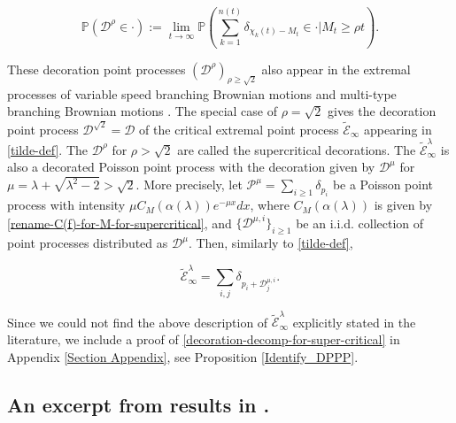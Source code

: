 \documentclass[a4paper,reqno]{amsart}%
\newcommand{\1}{\mathbf 1}
\theoremstyle{mine}
\numberwithin{theorem}{section}
\numberwithin{equation}{section}
\theoremstyle{remark}
\begin{document}
\begin{equation}\label{decoration_family}
     \mathbb P(\mathcal{D}^{\rho} \in \cdot) := \lim_{t\to\infty}\mathbb P(\sum_{k = 1}^{n(t)}\delta_{\chi_{k}(t) - M_{t} } \in \cdot | M_{t} \ge \rho t).
\end{equation}


These decoration point processes $(\mathcal{D}^{\rho})_{\rho \ge \sqrt{2}}$ also appear in the extremal processes of variable speed branching Brownian motions \cite{bovier2015variable} and multi-type branching Brownian motions \cite{belloum2021anomalous}. The special case of $\rho = \sqrt{2}$ gives the decoration point process $\mathcal{D}^{\sqrt{2}} = \mathcal{D}$ of the critical extremal point process $\widetilde{\mathcal{E}}_\infty$ appearing in \eqref{tilde-def}. The $\mathcal{D}^\rho$ for $\rho >\sqrt{2}$ are called the supercritical decorations. The $\widetilde{\mathcal E}_\infty^\lambda$ is also a decorated Poisson point process with the decoration given by $\mathcal{D}^\mu$ for $\mu = \lambda + \sqrt{\lambda^2 -2} >\sqrt{2}$. More precisely, let $\mathcal{P}^\mu = \sum_{i\geq 1}\delta_{p_i}$ be a Poisson point process with intensity $\mu C_M(\alpha(\lambda))e^{-\mu x}dx$, where $C_M(\alpha(\lambda))$ is given by \eqref{rename-C(f)-for-M-for-supercritical}, and $\{\mathcal{D}^{\mu, i}\}_{i\geq 1}$ be an i.i.d. collection of point processes distributed as $\mathcal{D}^{\mu}$. Then, similarly to \eqref{tilde-def}, 

\begin{equation}\label{decoration-decomp-for-super-critical}
    \widetilde{\mathcal{E}}_\infty^\lambda =\sum_{i, j} \delta_{p_i + \mathcal{D}^{\mu,i}_j}.
\end{equation}

Since we could not find the above description of $\widetilde{\mathcal{E}}_\infty^\lambda$ explicitly stated in the literature, we include a proof of \eqref{decoration-decomp-for-super-critical} in Appendix \ref{Section Appendix}, see Proposition \ref{Identify_DPPP}.



\subsection{An excerpt from results in \cite{Shekhar_Domain}.}
\end{document}
